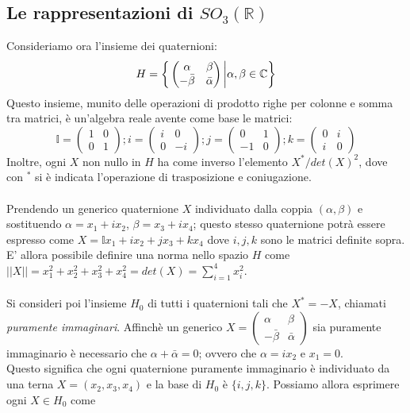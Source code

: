 \documentclass[12pt,a4paper]{report}
\theoremstyle{definition}
\theoremstyle{Theorem}
\theoremstyle{definition}
\theoremstyle{definition}
\theoremstyle{definition}
\begin{document}
\subsection{Le rappresentazioni di $SO_3(\mathbb{R})$}
Consideriamo ora l'insieme dei quaternioni:
$$H=\bigg{\{}
\begin{pmatrix}
	\alpha & \beta \\
	-\bar{\beta} & \bar{\alpha}
\end{pmatrix}
\bigg{\rvert}\alpha,\beta\in \mathbb{C}
\bigg{\}}$$
Questo insieme, munito delle operazioni di prodotto righe per colonne e somma tra matrici, è un'algebra reale avente come base le matrici:
$$\mathbb{I}=\begin{pmatrix}
	1 & 0 \\
	0 & 1
\end{pmatrix};
i=\begin{pmatrix}
	i & 0 \\
	0 & -i
\end{pmatrix};
j=\begin{pmatrix}
	0 & 1 \\
	-1 & 0
\end{pmatrix};
k=\begin{pmatrix}
	0 & i \\
	i & 0
\end{pmatrix}$$
Inoltre, ogni $X$ non nullo in $H$ ha come inverso l'elemento $X^*/det(X)^2$, dove con $^*$ si è indicata l'operazione di trasposizione e coniugazione.\\
\\
Prendendo un generico quaternione $X$ individuato dalla coppia $(\alpha,\beta)$ e sostituendo $\alpha=x_1+ix_2$, $\beta=x_3+ix_4$; questo stesso quaternione potrà essere espresso come $X=\mathbb{I}x_1+ix_2+jx_3+kx_4$ dove $i,j,k$ sono le matrici definite sopra. E' allora possibile definire una norma nello spazio $H$ come $||X||=x_1^2+x_2^2+x_3^2+x_4^2=det(X)=\sum_{i=1}^{4}x_i^2$.\\
\\
Si consideri poi l'insieme $H_0$ di tutti i quaternioni tali che $X^*=-X$, chiamati \textit{puramente immaginari}. Affinchè un generico $X=\begin{pmatrix}
	\alpha & \beta \\
	-\bar{\beta} & \bar{\alpha}
\end{pmatrix}$ sia puramente immaginario è necessario che $\alpha+\bar{\alpha}=0$; ovvero che $\alpha=ix_2$ e $x_1=0$.\\
Questo significa che ogni quaternione puramente immaginario è individuato da una terna $X=(x_2,x_3,x_4)$ e la base di $H_0$ è $\{i,j,k\}$. Possiamo allora esprimere ogni $X\in H_0$ come
\end{document}
